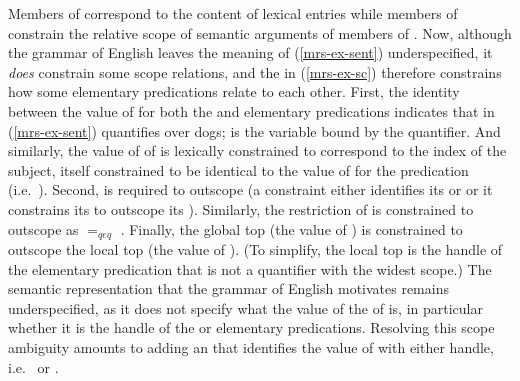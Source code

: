 \documentclass[output=paper]{langsci/langscibook}
\begin{document}
Members of  correspond to the content of lexical entries while members of  constrain the relative scope of semantic arguments of members of . Now, although the grammar of English leaves the meaning of (\ref{mrs-ex-sent}) underspecified, it \emph{does} constrain some scope relations, and the  in (\ref{mrs-ex-sc}) therefore constrains how some elementary predications relate to each other. First, the identity between the value of  for both the  and  elementary predications indicates that  in (\ref{mrs-ex-sent}) quantifies over dogs;  %
 is the variable bound by the quantifier. And similarly, the value of  of  is lexically constrained to correspond to the index of the subject, itself constrained to be identical to the value of  for the  predication (i.e.\ ). Second,  is required to outscope  (a  constraint either identifies its  or  or it constrains its  to outscope its ). %
Similarly, the restriction of  is constrained to  outscope  as  $=_{qeq}$ . Finally, the global top (the value of ) is constrained to outscope the local top (the value of ). (To simplify, the local top is the handle of the elementary predication that is not a quantifier with the widest scope.) The semantic representation that the grammar of English motivates remains underspecified, as it does not specify what the value of the  of  is, in particular whether it is the handle of the  or  elementary predications. Resolving this scope ambiguity amounts to adding an  that identifies the value of  with either handle, i.e.\  or . 
\end{document}
